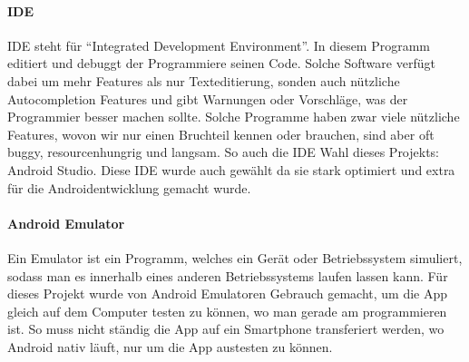 \documentclass[a4paper,11pt]{article}
\begin{document}
\paragraph{IDE}
IDE steht für ``Integrated Development Environment''. In diesem Programm editiert und debuggt der Programmiere seinen Code. Solche Software verfügt dabei um mehr Features als nur Texteditierung, sonden auch nützliche Autocompletion Features und gibt Warnungen oder Vorschläge, was der Programmier besser machen sollte. Solche Programme haben zwar viele nützliche Features, wovon wir nur einen Bruchteil kennen oder brauchen, sind aber oft buggy, resourcenhungrig und langsam. So auch die IDE Wahl dieses Projekts: Android Studio. Diese IDE wurde auch gewählt da sie stark optimiert und extra für die Androidentwicklung gemacht wurde.


\paragraph{Android Emulator}

Ein Emulator ist ein Programm, welches ein Gerät oder Betriebssystem simuliert, sodass man es innerhalb eines anderen Betriebssystems laufen lassen kann. Für dieses Projekt wurde von Android Emulatoren Gebrauch gemacht, um die App gleich auf dem Computer testen zu können, wo man gerade am programmieren ist. So muss nicht ständig die App auf ein Smartphone transferiert werden, wo Android nativ läuft, nur um die App austesten zu können.
\end{document}

